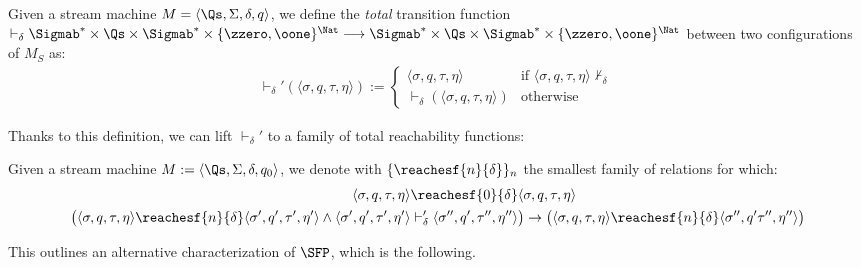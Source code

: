 \begin{conditional}{\notappendix}
  \begin{defn}
    \label{def:smtotaltransfun}
  Given a stream machine $M=\langle \Qs,
  \Sigma, \delta, q\rangle$,
  we define the \emph{total} transition function
  $\vdash_{\delta} \Sigmab^* \times \Qs
  \times \Sigmab^* \times \{\zzero,
  \oone\}^{\Nat} \longrightarrow \Sigmab^*
  \times \Qs \times \Sigmab^* \times \{\zzero,
  \oone\}^{\Nat}$
  between two configurations of $M_S$ as:
  \begin{align*}
  \vdash_{\delta}'(\langle \sigma, q, \tau, \eta\rangle):= \begin{cases}
    \langle \sigma, q, \tau, \eta\rangle & \text{if } \langle \sigma, q, \tau, \eta\rangle \not \vdash_{\delta}\\
    \vdash_{\delta}(\langle \sigma, q, \tau, \eta\rangle) & \text{otherwise}
  \end{cases}
  \end{align*}
  \end{defn}

  Thanks to this definition, we can lift $\vdash_{\delta}'$ to a family of
  total reachability functions:

  \begin{defn}
    \label{def:smtotalreachfuns}
  Given a stream machine $M:=\langle \Qs,
  \Sigma, \delta, q_0\rangle$,
  we denote with $\{{\reachesf {n} {\delta}}\}_n$
  the smallest family of relations
  for which:
  \begin{align*}
  \langle \sigma, q, \tau, \eta \rangle
  &{\reachesf {0} {\delta}}
  \langle \sigma, q, \tau, \eta\rangle \\
  \big(\langle \sigma, q, \tau, \eta\rangle
  {\reachesf {n} {\delta}} \langle \sigma',
  q', \tau',\eta'\rangle
  \wedge \langle \sigma', q',
  \tau', \eta'\rangle
  &\vdash_{\delta}'
  \langle \sigma'', q', \tau'',
  \eta'' \rangle \big)\rightarrow\big(
  \langle \sigma,q,\tau, \eta\rangle
  {\reachesf {n} {\delta}}\langle
  \sigma'', q'\tau'',\eta''\rangle\big)
  \end{align*}
  \end{defn}

  This outlines an alternative characterization of $\SFP$, which is the following.


\end{conditional}
